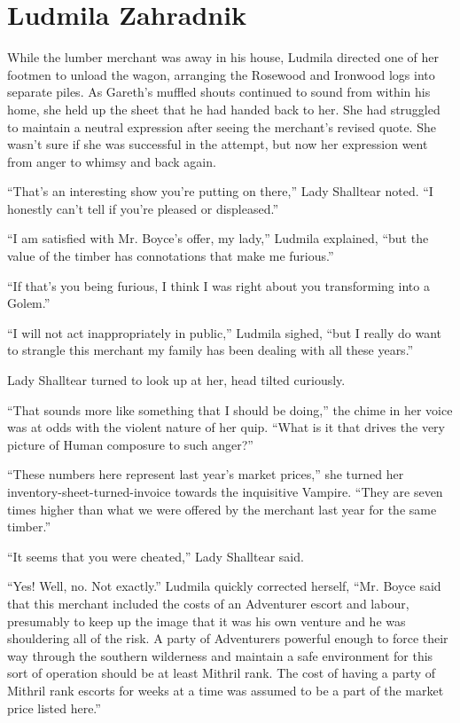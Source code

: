 \chapter{Ludmila Zahradnik}

While the lumber merchant was away in his house, Ludmila directed one of her footmen to unload the wagon, arranging the Rosewood and Ironwood logs into separate piles. As Gareth’s muffled shouts continued to sound from within his home, she held up the sheet that he had handed back to her. She had struggled to maintain a neutral expression after seeing the merchant’s revised quote. She wasn’t sure if she was successful in the attempt, but now her expression went from anger to whimsy and back again.

 

“That’s an interesting show you’re putting on there,” Lady Shalltear noted. “I honestly can’t tell if you’re pleased or displeased.”

 

“I am satisfied with Mr. Boyce’s offer, my lady,” Ludmila explained, “but the value of the timber has connotations that make me furious.”

 

“If that’s you being furious, I think I was right about you transforming into a Golem.”

 

“I will not act inappropriately in public,” Ludmila sighed, “but I really do want to strangle this merchant my family has been dealing with all these years.”

 

Lady Shalltear turned to look up at her, head tilted curiously.

 

“That sounds more like something that I should be doing,” the chime in her voice was at odds with the violent nature of her quip. “What is it that drives the very picture of Human composure to such anger?”

 

“These numbers here represent last year’s market prices,” she turned her inventory-sheet-turned-invoice towards the inquisitive Vampire. “They are seven times higher than what we were offered by the merchant last year for the same timber.”

 

“It seems that you were cheated,” Lady Shalltear said.

 

“Yes! Well, no. Not exactly.” Ludmila quickly corrected herself, “Mr. Boyce said that this merchant included the costs of an Adventurer escort and labour, presumably to keep up the image that it was his own venture and he was shouldering all of the risk. A party of Adventurers powerful enough to force their way through the southern wilderness and maintain a safe environment for this sort of operation should be at least Mithril rank. The cost of having a party of Mithril rank escorts for weeks at a time was assumed to be a part of the market price listed here.”

